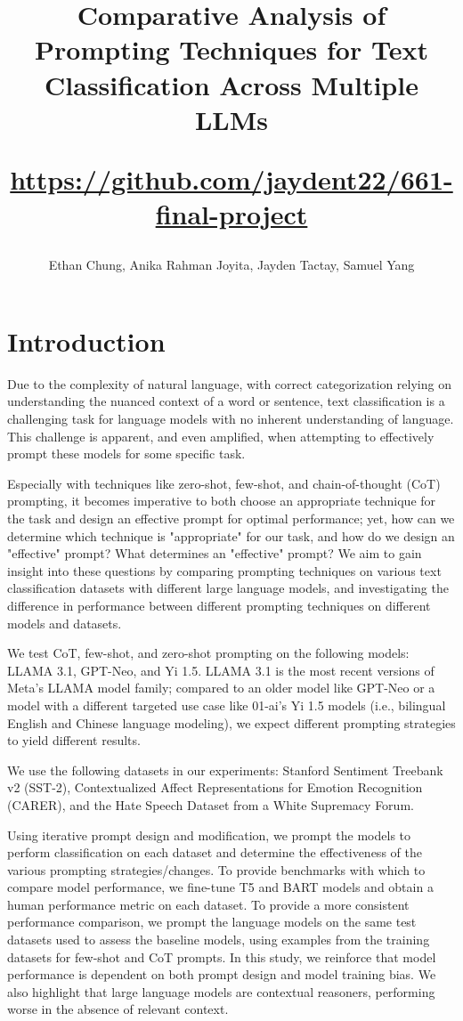 \documentclass[twocolumn]{article}
\title{Comparative Analysis of Prompting Techniques for Text Classification Across Multiple LLMs \\ \begin{small}\url{https://github.com/jaydent22/661-final-project}\end{small}}
\author{Ethan Chung, Anika Rahman Joyita, Jayden Tactay, Samuel Yang}
\date{}
\begin{document}
\maketitle

\section{Introduction}

Due to the complexity of natural language, with correct categorization relying on understanding the nuanced context of a word or sentence, text classification is a challenging task for language models with no inherent understanding of language. This challenge is apparent, and even amplified, when attempting to effectively prompt these models for some specific task.

Especially with techniques like zero-shot, few-shot, and chain-of-thought (CoT) prompting, it becomes imperative to both choose an appropriate technique for the task and design an effective prompt for optimal performance; yet, how can we determine which technique is "appropriate" for our task, and how do we design an "effective" prompt? What determines an "effective" prompt? We aim to gain insight into these questions by comparing prompting techniques on various text classification datasets with different large language models, and investigating the difference in performance between different prompting techniques on different models and datasets.

We test CoT, few-shot, and zero-shot prompting on the following models: LLAMA 3.1, GPT-Neo, and Yi 1.5. LLAMA 3.1 is the most recent versions of Meta’s LLAMA model family; compared to an older model like GPT-Neo or a model with a different targeted use case like 01-ai’s Yi 1.5 models (i.e., bilingual English and Chinese language modeling), we expect different prompting strategies to yield different results.

We use the following datasets in our experiments: Stanford Sentiment Treebank v2 (SST-2), Contextualized Affect Representations for Emotion Recognition (CARER), and the Hate Speech Dataset from a White Supremacy Forum.

Using iterative prompt design and modification, we prompt the models to perform classification on each dataset and determine the effectiveness of the various prompting strategies/changes. To provide benchmarks with which to compare model performance, we fine-tune T5 and BART models and obtain a human performance metric on each dataset. To provide a more consistent performance comparison, we prompt the language models on the same test datasets used to assess the baseline models, using examples from the training datasets for few-shot and CoT prompts. In this study, we reinforce that model performance is dependent on both prompt design and model training bias. We also highlight that large language models are contextual reasoners, performing worse in the absence of relevant context.
\end{document}
